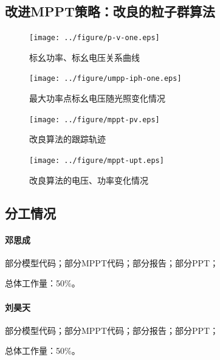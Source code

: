 \documentclass[a4paper,12pt]{article}
\begin{document}
    \subsection{改进MPPT策略：改良的粒子群算法} %
    \label{sub:改进mppt策略_改良的粒子群算法}
    \begin{figure}[htbp]
        \centering
        \texttt{[image: ../figure/p-v-one.eps]}
        \caption{标幺功率、标幺电压关系曲线}
        \label{fig:p-v-one}
    \end{figure}
    \begin{figure}[htbp]
        \centering
        \texttt{[image: ../figure/umpp-iph-one.eps]}
        \caption{最大功率点标幺电压随光照变化情况}
        \label{fig:umpp-iph-one}
    \end{figure}
    \begin{figure}[htbp]
        \centering
        \texttt{[image: ../figure/mppt-pv.eps]}
        \caption{改良算法的跟踪轨迹}
        \label{fig:mppt-pv}
    \end{figure}
    \begin{figure}[htbp]
        \centering
        \texttt{[image: ../figure/mppt-upt.eps]}
        \caption{改良算法的电压、功率变化情况}
        \label{fig:mppt-upt}
    \end{figure}
    \begin{appendix}
        \section{分工情况} %
        \label{sec:fengong}
        \paragraph{邓思成} %
        \label{par:邓思成}
        部分模型代码；部分MPPT代码；部分报告；部分PPT；

        总体工作量：50\%。
        \paragraph{刘昊天} %
        \label{par:刘昊天}
        部分模型代码；部分MPPT代码；部分报告；部分PPT；

        总体工作量：50\%。
    \end{appendix}

\end{document}
